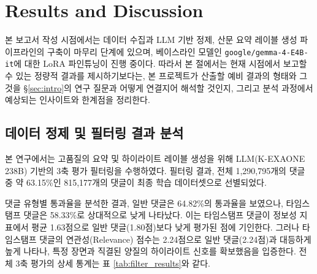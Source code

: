 \documentclass[11pt,a4paper]{article}
\begin{document}
\section{Results and Discussion}\label{sec:results}

본 보고서 작성 시점에서는 데이터 수집과 LLM 기반 정제, 산문 요약 레이블 생성 파이프라인의 구축이 마무리 단계에 있으며, 베이스라인 모델인 \texttt{google/gemma-4-E4B-it}에 대한 LoRA 파인튜닝이 진행 중이다. 따라서 본 절에서는 현재 시점에서 보고할 수 있는 정량적 결과를 제시하기보다는, 본 프로젝트가 산출할 예비 결과의 형태와 그것을 \S\ref{sec:intro}의 연구 질문과 어떻게 연결지어 해석할 것인지, 그리고 분석 과정에서 예상되는 인사이트와 한계점을 정리한다.

\subsection{데이터 정제 및 필터링 결과 분석}\label{subsec:filter_res}

본 연구에서는 고품질의 요약 및 하이라이트 레이블 생성을 위해 LLM(K-EXAONE 238B) 기반의 3축 평가 필터링을 수행하였다. 필터링 결과, 전체 1,290,795개의 댓글 중 약 63.15\%인 815,177개의 댓글이 최종 학습 데이터셋으로 선별되었다.

댓글 유형별 통과율을 분석한 결과, 일반 댓글은 64.82\%의 통과율을 보였으나, 타임스탬프 댓글은 58.33\%로 상대적으로 낮게 나타났다. 이는 타임스탬프 댓글이 정보성 지표에서 평균 1.63점으로 일반 댓글(1.80점)보다 낮게 평가된 점에 기인한다. 그러나 타임스탬프 댓글의 연관성(Relevance) 점수는 2.24점으로 일반 댓글(2.24점)과 대등하게 높게 나타나, 특정 장면과 직결된 양질의 하이라이트 신호를 확보했음을 입증한다. 전체 3축 평가의 상세 통계는 표 \ref{tab:filter_results}와 같다.
\end{document}
